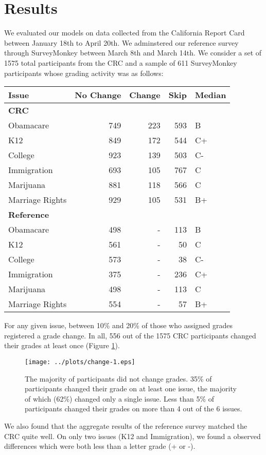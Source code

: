 \section{Results}
We evaluated our models on data collected from the California Report Card between January 18th to April 20th.
We adminstered our reference survey through SurveyMonkey between March 8th and March 14th.
We consider a set of 1575 total participants from the CRC and a sample of 611 SurveyMonkey participants whose grading activity was as follows:

\begin{tabular}[!ht] { l | r | r | r | l }
Issue & No Change & Change & Skip & Median \\
\hline
\hline
  \multicolumn{5}{l}{\textbf{CRC}}\\
  \hline
  Obamacare & 749 & 223 & 593 & B \\
  \hline
  K12 & 849 & 172 & 544 & C+ \\
  \hline
  College & 923 & 139 & 503 & C-\\
  \hline
  Immigration & 693 & 105 & 767 & C \\
  \hline
  Marijuana & 881 & 118 & 566 & C \\
  \hline
  Marriage Rights & 929 & 105 & 531 & B+\\
\hline
\hline
\multicolumn{5}{l}{\textbf{Reference}}\\
\hline
  Obamacare & 498 & - & 113 & B \\
  \hline
  K12 & 561 & - & 50 & C \\
  \hline
  College & 573 & - & 38 & C-\\
  \hline
  Immigration & 375 & - & 236 & C+ \\
  \hline
  Marijuana & 498 & - & 113 & C \\
  \hline
  Marriage Rights & 554 & - & 57 & B+
\end{tabular}

For any given issue, between 10\% and 20\% of those who assigned grades registered a grade change.
In all, 556 out of the 1575 CRC participants changed their grades at least once (Figure \ref{change-1}).
\begin{figure}[h]
  \centering
    \texttt{[image: ../plots/change-1.eps]}
      \caption{The majority of participants did not change grades. 35\% of participants changed their grade on at least one issue, the majority of which (62\%) changed only a single issue. Less than 5\% of participants changed their grades on more than 4 out of the 6 issues.}
      \label{change-1}
\end{figure}
We also found that the aggregate results of the reference survey matched the CRC quite well.
On only two issues (K12 and Immigration), we found a observed differences which were both less than a letter grade (+ or -).

